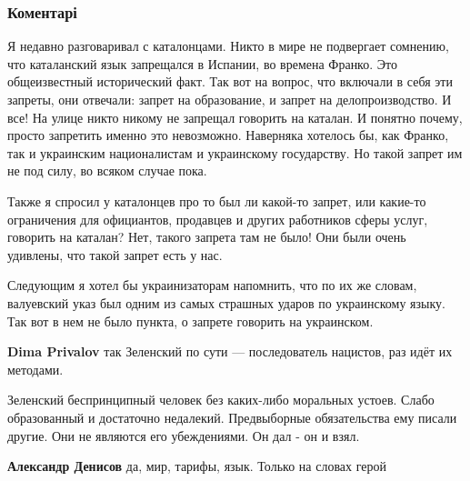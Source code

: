  
 
 
 
 
\subsubsection{Коментарі}

\begin{itemize} %

Я недавно разговаривал с каталонцами. Никто в мире не подвергает сомнению, что
каталанский язык запрещался в Испании, во времена Франко. Это общеизвестный
исторический факт. Так вот на вопрос, что включали в себя эти запреты, они
отвечали: запрет на образование, и запрет на делопроизводство. И все! На улице
никто никому не запрещал говорить на каталан. И понятно почему, просто
запретить именно это невозможно. Наверняка хотелось бы, как Франко, так и
украинским националистам и украинскому государству. Но такой запрет им не под
силу, во всяком случае пока.

Также я спросил у каталонцев про то был ли какой-то запрет, или какие-то
ограничения для официантов, продавцев и других работников сферы услуг, говорить
на каталан? Нет, такого запрета там не было! Они были очень удивлены, что такой
запрет есть у нас.

Следующим я хотел бы украинизаторам напомнить, что по их же словам, валуевский
указ был одним из самых страшных ударов по украинскому языку. Так вот в нем не
было пункта, о запрете говорить на украинском.

\begin{itemize} %
\textbf{Dima Privalov} так Зеленский по сути — последователь нацистов, раз идёт их методами.
\end{itemize} %


Зеленский беспринципный человек без каких-либо моральных устоев. Слабо
образованный и достаточно недалекий. Предвыборные обязательства ему писали
другие. Они не являются его убеждениями. Он дал - он и взял.

\begin{itemize} %
\textbf{Александр Денисов} да, мир, тарифы, язык. Только на словах герой
\end{itemize} %


\end{itemize}

